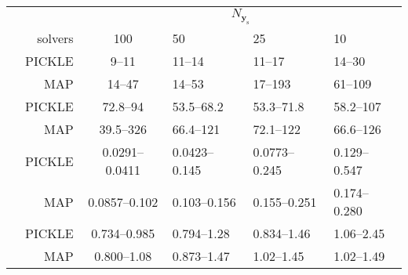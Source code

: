 \documentclass{agujournal2019}
\renewcommand{\caption}[2][]{\ignorespaces}
\begin{document}
\begin{table}[!htbp]
    \vspace{1em}%
    \begin{subtable}{\textwidth}
        \caption{Known Neumann boundary conditions}%
        \label{tab:RF2_1x_known_flux_results}%
        \begin{tabu} to 
            \toprule
            & &  \\
            & solvers & 100 & 50 & 25 & 10\\
            \midrule
             & PICKLE & 9--11 & 11--14 & 11--17 & 14--30 \\
            & MAP & 14--47 & 14--53 & 17--193 & 61--109 \\
            \midrule
             & PICKLE & 72.8--94 & 53.5--68.2 & 53.3--71.8 & 58.2--107 \\
            & MAP & 39.5--326 & 66.4--121 & 72.1--122 & 66.6--126 \\
            \midrule
             & PICKLE & 0.0291--0.0411 & 0.0423--0.145 & 0.0773--0.245 & 0.129--0.547 \\
            & MAP & 0.0857--0.102 & 0.103--0.156 & 0.155--0.251 & 0.174--0.280 \\
            \midrule
             & PICKLE & 0.734--0.985 & 0.794--1.28 & 0.834--1.46 & 1.06--2.45 \\
            & MAP & 0.800--1.08 & 0.873--1.47 & 1.02--1.45 & 1.02--1.49 \\
            \bottomrule
        \end{tabu}
    \end{subtable}
\end{table}
\end{document}
